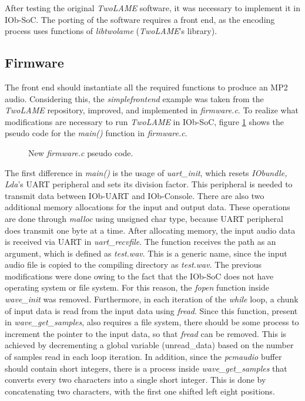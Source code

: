 After testing the original \textit{TwoLAME} software, it was necessary to implement it in IOb-SoC. The porting of the software requires a front end, as the encoding process uses functions of \textit{libtwolame} (\textit{TwoLAME}'s library). 

\subsection{Firmware}

The front end should instantiate all the required functions to produce an MP2 audio. Considering this, the \textit{simplefrontend} example was taken from the \textit{TwoLAME} repository, improved, and implemented in \textit{firmware.c}.
To realize what modifications are necessary to run \textit{TwoLAME} in IOb-SoC, figure \ref{newpseudo} shows the pseudo code for the \textit{main()} function in \textit{firmware.c}.

\begin{figure}[H]
\centerline{}
\caption{New \textit{firmware.c} pseudo code.}
\label{newpseudo}
\end{figure}

The first difference in \textit{main()} is the usage of \textit{uart\_init}, which resets \textit{IObundle, Lda}’s UART peripheral and sets its division factor. This peripheral is needed to transmit data between IOb-UART and IOb-Console. 
There are also two additional memory allocations for the input and output data. These operations are done through \textit{malloc} using unsigned char type, because UART peripheral does transmit one byte at a time.
After allocating memory, the input audio data is received via UART in \textit{uart\_recvfile}. The function receives the path as an argument, which is defined as \textit{test.wav}. This is a generic name, since the input audio file is copied to the compiling directory as \textit{test.wav}.
The previous modifications were done owing to the fact that the IOb-SoC does not have operating system or file system. For this reason, the \textit{fopen} function inside \textit{wave\_init} was removed. Furthermore, in each iteration of the \textit{while} loop, a chunk of input data is read from the input data using \textit{fread}. Since this function, present in \textit{wave\_get\_samples}, also requires a file system, there should be some process to increment the pointer to the input data, so that \textit{fread} can be removed. This is achieved by decrementing a global variable (unread\_data) based on the number of samples read in each loop iteration. In addition, since the \textit{pcmaudio} buffer should contain short integers, there is a process inside \textit{wave\_get\_samples} that converts every two characters into a single short integer. This is done by concatenating two characters, with the first one shifted left eight positions.

